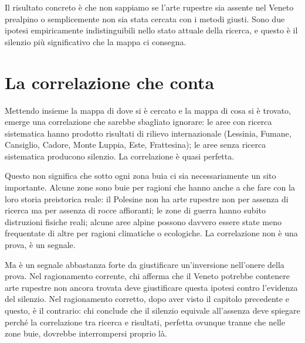 Il risultato concreto è che non sappiamo se l'arte rupestre sia assente nel Veneto prealpino o semplicemente non sia stata cercata con i metodi giusti. Sono due ipotesi empiricamente indistinguibili nello stato attuale della ricerca, e questo è il silenzio più significativo che la mappa ci consegna.

\section{La correlazione che conta}

Mettendo insieme la mappa di dove si è cercato e la mappa di cosa si è trovato, emerge una correlazione che sarebbe sbagliato ignorare: le aree con ricerca sistematica hanno prodotto risultati di rilievo internazionale (Lessinia, Fumane, Cansiglio, Cadore, Monte Luppia, Este, Frattesina); le aree senza ricerca sistematica producono silenzio. La correlazione è quasi perfetta.

Questo non significa che sotto ogni zona buia ci sia necessariamente un sito importante. Alcune zone sono buie per ragioni che hanno anche a che fare con la loro storia preistorica reale: il Polesine non ha arte rupestre non per assenza di ricerca ma per assenza di rocce affioranti; le zone di guerra hanno subito distruzioni fisiche reali; alcune aree alpine possono davvero essere state meno frequentate di altre per ragioni climatiche o ecologiche. La correlazione non è una prova, è un segnale.

Ma è un segnale abbastanza forte da giustificare un'inversione nell'onere della prova. Nel ragionamento corrente, chi afferma che il Veneto potrebbe contenere arte rupestre non ancora trovata deve giustificare questa ipotesi contro l'evidenza del silenzio. Nel ragionamento corretto, dopo aver visto il capitolo precedente e questo, è il contrario: chi conclude che il silenzio equivale all'assenza deve spiegare perché la correlazione tra ricerca e risultati, perfetta ovunque tranne che nelle zone buie, dovrebbe interrompersi proprio là.

